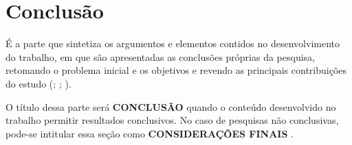 \chapter{Conclusão}

É a parte que sintetiza os argumentos e elementos contidos no desenvolvimento do trabalho, em que são apresentadas as conclusões próprias da pesquisa, retomando o problema inicial e os objetivos e revendo as principais contribuições do estudo (\cite{andrade}; \cite{koche}; \cite{barros}).

O título dessa parte será \textbf{CONCLUSÃO} quando o conteúdo desenvolvido no trabalho permitir resultados conclusivos. No caso de pesquisas não conclusivas, pode-se intitular essa seção como \textbf{CONSIDERAÇÕES FINAIS} \cite{andrade}.